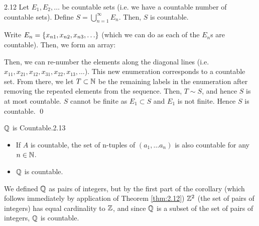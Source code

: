 \begin{theorem}{}{2.12}
    Let $E_1, E_2, \ldots$ be countable sets (i.e. we have a countable number of countable sets). Define $S = \bigcup_{n=1}^{\infty} E_n$. Then, $S$ is countable. 
\end{theorem}
\begin{nproof}
    Write $E_n = \set{x_{n1}, x_{n2}, x_{n3}, \ldots}$ (which we can do as each of the $E_n$s are countable). Then, we form an array:
    \begin{center}
    \end{center}
    Then, we can re-number the elements along the diagonal lines (i.e. $x_{11}, x_{21}, x_{12}, x_{31}, x_{22}, x_{13}, \ldots$). This new enumeration corresponds to a countable set. From there, we let $T \subset \mathbb{N}$ be the remaining labels in the enumeration after removing the repeated elements from the sequence. Then, $T \sim S$, and hence $S$ is at most countable. $S$ cannot be finite as $E_1 \subset S$ and $E_1$ is not finite. Hence $S$ is countable. \qed
\end{nproof}

\begin{corollary}{$\mathbb{Q}$ is Countable.}{2.13}
    \begin{itemize}
        \item If $A$ is countable, the set of n-tuples of $(a_1, \ldots a_n)$ is also countable for any $n \in \mathbb{N}$.  
        \item $\mathbb{Q}$ is countable.
    \end{itemize}
\end{corollary}
\noindent We defined $\mathbb{Q}$ as pairs of integers, but by the first part of the corollary (which follows immediately by application of Theorem \ref{thm:2.12}) $\mathbb{Z}^2$ (the set of pairs of integers) has equal cardinality to $\mathbb{Z}$, and since $\mathbb{Q}$ is a subset of the set of pairs of integers, $\mathbb{Q}$ is countable. 

